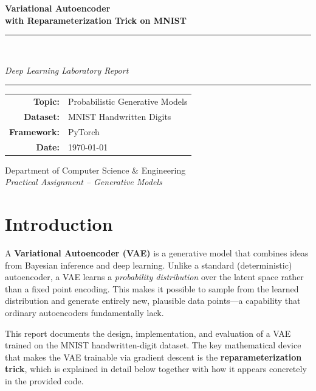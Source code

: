 \documentclass[12pt,a4paper]{article}
\begin{document}
\begin{titlepage}
    \centering
    \vspace*{1.5cm}
    {\Huge\bfseries Variational Autoencoder\\[0.4em]
    \large with Reparameterization Trick on MNIST\par}
    \vspace{1cm}
    \rule{\linewidth}{0.5pt}\\[0.4cm]
    {\large\itshape Deep Learning Laboratory Report\par}
    \rule{\linewidth}{0.5pt}
    \vspace{1.5cm}

    \begin{tabular}{rl}
        \textbf{Topic:}   & Probabilistic Generative Models \\[4pt]
        \textbf{Dataset:} & MNIST Handwritten Digits \\[4pt]
        \textbf{Framework:} & PyTorch \\[4pt]
        \textbf{Date:}    & \today \\
    \end{tabular}

    \vfill
    {\large Department of Computer Science \& Engineering\\
    \textit{Practical Assignment -- Generative Models}}
\end{titlepage}

\section{Introduction}

A \textbf{Variational Autoencoder (VAE)} is a generative model that combines ideas from Bayesian inference and deep learning. Unlike a standard (deterministic) autoencoder, a VAE learns a \emph{probability distribution} over the latent space rather than a fixed point encoding. This makes it possible to sample from the learned distribution and generate entirely new, plausible data points—a capability that ordinary autoencoders fundamentally lack.

This report documents the design, implementation, and evaluation of a VAE trained on the MNIST handwritten-digit dataset. The key mathematical device that makes the VAE trainable via gradient descent is the \textbf{reparameterization trick}, which is explained in detail below together with how it appears concretely in the provided code.
\end{document}
